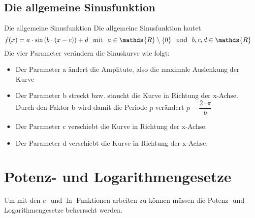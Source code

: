 \subsection{Die allgemeine Sinusfunktion}
\begin{b8d}{Die allgemeine Sinusfunktion}{} \label{SinCosAllgFunkt}
    Die allgemeine Sinusfunktion lautet $$f(x)= a\cdot \sin{(b\cdot (x - c))}+d \hspace{0.25cm} \text{mit} \hspace{0.25cm} a\in \mathds{R}\setminus\{0\} \hspace{0.25cm} \text{und} \hspace{0.25cm} b,c,d \in \mathds{R}$$
    Die vier Parameter verändern die Sinuskurve wie folgt:
    \begin{itemize}
        \item Der Parameter a ändert die Amplitute, also die maximale Auslenkung der Kurve
        \item Der Parameter b streckt bzw. staucht die Kurve in Richtung der x-Achse. Durch den Faktor b wird damit die Periode $p$ verändert $p = \dfrac{2\cdot \pi}{b}$
        \item Der Parameter c verschiebt die Kurve in Richtung der x-Achse.
        \item Der Parameter d verschiebt die Kurve in Richtung der x-Achse.
    \end{itemize}
\end{b8d}
\begin{center}
\end{center}
\section{Potenz- und Logarithmengesetze}
Um mit den $e$- und  $\ln$-Funktionen arbeiten zu können müssen die Potenz- und Logarithmengesetze beherrscht werden.
